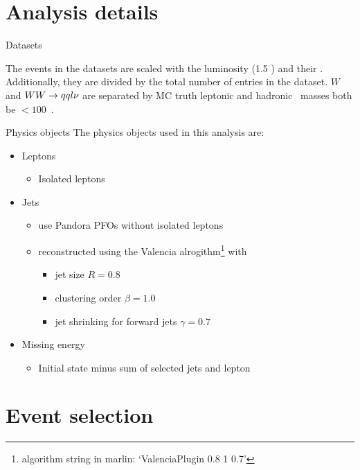\documentclass{beamer}
\newcommand{\texpath}{../analysis/tex/tex_ex}
\begin{document}
\section{Analysis details}

\begin{frame}{Datasets}

\vspace{-0.5cm}
The events in the datasets are scaled with the luminosity (1.5 \invab) and their \xsec.
%
Additionally, they are divided by the total number of entries in the dataset.
%
$W$ and $WW\rightarrow qql\nu$ are separated by MC truth leptonic and hadronic \Wboson\ masses both be $< 100$~\GeV.
\end{frame}


\begin{frame}{Physics objects}
The physics objects used in this analysis are:
\begin{itemize}
  \item Leptons
  \begin{itemize}
    \item Isolated leptons
  \end{itemize}
  \item Jets
  \begin{itemize}
    \item use Pandora PFOs without isolated leptons
    \item reconstructed using the Valencia alrogithm\footnote{algorithm string in marlin: `ValenciaPlugin 0.8 1 0.7'} with
    \begin{itemize}
      \item jet size $R=0.8$
      \item clustering order $\beta=1.0$
      \item jet shrinking for forward jets $\gamma=0.7$
    \end{itemize}
  \end{itemize}
  \item Missing energy
  \begin{itemize}
    \item Initial state minus sum of selected jets and lepton
  \end{itemize}
\end{itemize}
\end{frame}










\section{Event selection}
\end{document}
